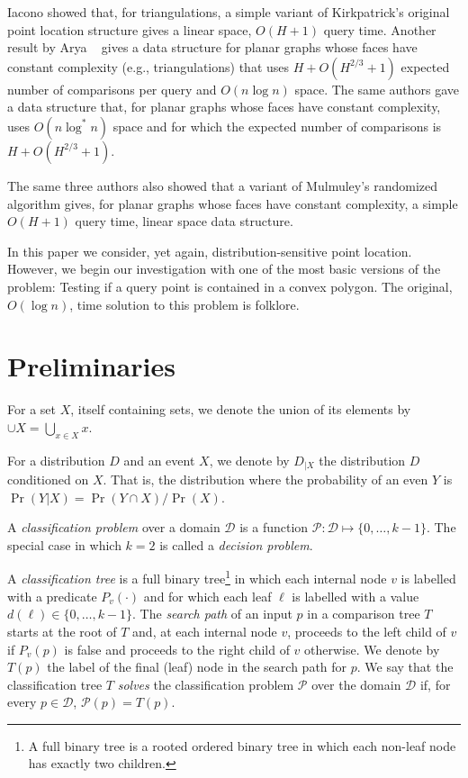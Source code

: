 \documentclass[charterfonts,lotsofwhite]{patmorin}
\begin{document}
Iacono \cite{iXX} showed that, for triangulations, a simple variant of
Kirkpatrick's original point location structure gives a linear space,
$O(H+1)$ query time.  Another result by Arya \etal\ \cite{ammXX} gives
a data structure for planar graphs whose faces have constant
complexity (e.g., triangulations) that uses $H + O(H^{2/3}+1)$
expected number of comparisons per query and $O(n\log n)$ space.   The
same authors \cite{ammXX} gave a data structure that, for planar
graphs whose faces have constant complexity, uses $O(n\log^* n)$ space
and for which the expected number of comparisons is $H+O(H^{2/3}+1)$.

The same three authors \cite{ammXX} also showed that a variant of
Mulmuley's randomized algorithm gives, for planar graphs whose faces
have constant complexity, a simple $O(H+1)$ query time, linear space
data structure. 

In this paper we consider, yet again, distribution-sensitive point
location. However, we begin our investigation with one of the most
basic versions of the problem:  Testing if a query point is contained
in a convex polygon. The original, $O(\log n)$, time solution to this
problem is folklore.

\section{Preliminaries}

For a set $X$, itself containing sets, we denote the union of its
elements by $\cup X=\bigcup_{x\in X} x$.

For a distribution $D$ and an event $X$, we denote by $D_{|X}$ the
distribution $D$ conditioned on $X$.  That is, the distribution where 
the probability of an even $Y$ is
$\Pr(Y|X)=\Pr(Y\cap X)/\Pr(X)$.

A \emph{classification problem} over a domain $\mathcal{D}$ is a function
$\mathcal{P}:\mathcal{D}\mapsto \{0,\ldots,k-1\}$.  The special case
in which $k=2$ is called a \emph{decision problem}.

A \emph{classification tree} is a full binary tree\footnote{A full
binary tree is a rooted ordered binary tree in which each non-leaf
node has exactly two children.} in which each internal node $v$ is
labelled with a predicate $P_v(\cdot)$ and for which each leaf $\ell$
is labelled with a value $d(\ell)\in\{0,\ldots,k-1\}$. The
\emph{search path} of an input $p$ in a comparison tree $T$ starts at
the root of $T$ and, at each internal node $v$, proceeds to the left
child of $v$ if $P_v(p)$ is false and proceeds to the right child of
$v$ otherwise.  We denote by $T(p)$ the label of the final (leaf) node
in the search path for $p$.  We say that the classification tree $T$
\emph{solves} the classification problem $\mathcal{P}$ over the domain
$\mathcal{D}$ if, for every $p\in \mathcal{D}$, $\mathcal{P}(p)=T(p)$.
\end{document}
